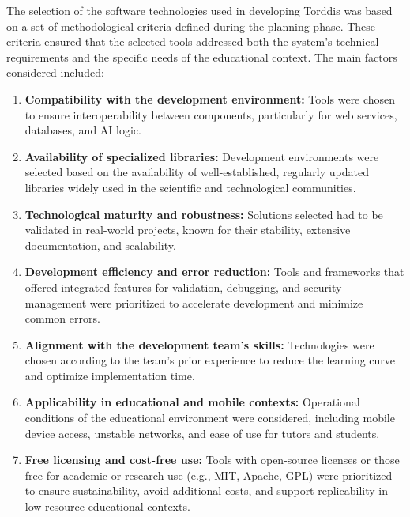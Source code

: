                 The selection of the software technologies used in developing Torddis was based on a set of methodological criteria defined during the planning phase. These criteria ensured that the selected tools addressed both the system’s technical requirements and the specific needs of the educational context. The main factors considered included:
                
                \begin{enumerate}
                    \item \textbf{Compatibility with the development environment:} Tools were chosen to ensure interoperability between components, particularly for web services, databases, and AI logic.
                    
                    \item \textbf{Availability of specialized libraries:} Development environments were selected based on the availability of well-established, regularly updated libraries widely used in the scientific and technological communities.
                    
                    \item \textbf{Technological maturity and robustness:} Solutions selected had to be validated in real-world projects, known for their stability, extensive documentation, and scalability.
                    
                    \item \textbf{Development efficiency and error reduction:} Tools and frameworks that offered integrated features for validation, debugging, and security management were prioritized to accelerate development and minimize common errors.
                    
                    \item \textbf{Alignment with the development team’s skills:} Technologies were chosen according to the team’s prior experience to reduce the learning curve and optimize implementation time.
                    
                    \item \textbf{Applicability in educational and mobile contexts:} Operational conditions of the educational environment were considered, including mobile device access, unstable networks, and ease of use for tutors and students.
                    
                    \item \textbf{Free licensing and cost-free use:} Tools with open-source licenses or those free for academic or research use (e.g., MIT, Apache, GPL) were prioritized to ensure sustainability, avoid additional costs, and support replicability in low-resource educational contexts.
                \end{enumerate}
                
